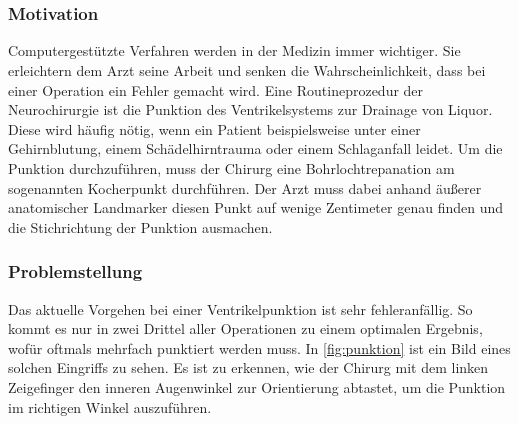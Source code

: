 \chapter{}
\label{sec:Introduction}

\subsection{Motivation}

Computergestützte Verfahren werden in der Medizin immer wichtiger. Sie erleichtern dem Arzt seine Arbeit und senken die Wahrscheinlichkeit, dass bei einer Operation ein Fehler gemacht wird.
\newline
Eine Routineprozedur der Neurochirurgie ist die Punktion des Ventrikelsystems zur Drainage von Liquor. Diese wird häufig nötig, wenn ein Patient beispielsweise unter einer Gehirnblutung, einem Schädelhirntrauma oder einem Schlaganfall leidet.
\newline
Um die Punktion durchzuführen, muss der Chirurg eine Bohrlochtrepanation am sogenannten Kocherpunkt durchführen. Der Arzt muss dabei anhand äußerer anatomischer Landmarker diesen Punkt auf wenige Zentimeter genau finden und die Stichrichtung der Punktion ausmachen.



\subsection{Problemstellung}

Das aktuelle Vorgehen bei einer Ventrikelpunktion ist sehr fehleranfällig. So kommt es nur in zwei Drittel aller Operationen zu einem optimalen Ergebnis, wofür oftmals mehrfach punktiert werden muss. In \autoref{fig:punktion} ist ein Bild eines solchen Eingriffs zu sehen. Es ist zu erkennen, wie der Chirurg mit dem linken Zeigefinger den inneren Augenwinkel zur Orientierung abtastet, um die Punktion im richtigen Winkel auszuführen.


